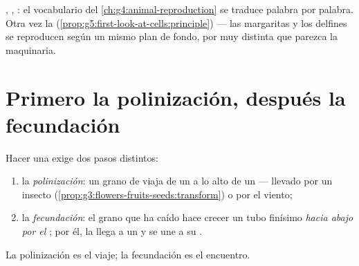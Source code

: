 \begin{remark}\label{rem:g5:flower-to-fruit:sameplan}
 ,  , : el vocabulario del
\cref{ch:g4:animal-reproduction} se traduce palabra por palabra. Otra
vez la 
(\cref{prop:g5:first-look-at-cells:principle}) --- las margaritas y
los delfines se reproducen según un mismo plan de fondo, por muy
distinta que parezca la maquinaria.
\end{remark}

\section{Primero la polinización, después la fecundación}

\begin{definition}\label{def:g5:flower-to-fruit:steps}
Hacer una  exige dos pasos distintos:
\begin{enumerate}
  \item la \emph{polinización}: un grano de 
        viaja de un  a lo alto de un  --- llevado por un
        insecto (\cref{prop:g3:flowers-fruits-seeds:transform}) o por
        el viento;
  \item la \emph{fecundación}: el grano
        que ha caído hace crecer un tubo finísimo \emph{hacia abajo por
        el }; por él, la   llega a un  y se
        une a su  .
\end{enumerate}
La polinización es el viaje; la fecundación es el encuentro.
\end{definition}

